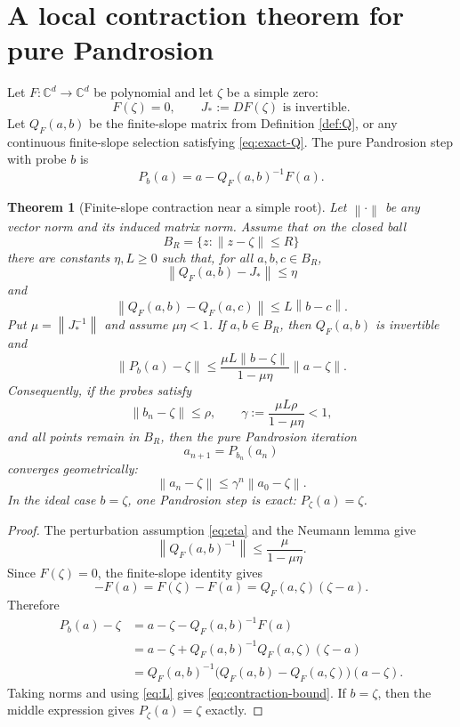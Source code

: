 \documentclass[11pt]{article}
\newtheorem{theorem}{Theorem}[section]
\theoremstyle{definition}
\theoremstyle{remark}
\newcommand{\C}{\mathbb{C}}
\newcommand{\norm}[1]{\left\lVert #1\right\rVert}
\newcommand{\zetaRoot}{\zeta}
\begin{document}
\section{A local contraction theorem for pure Pandrosion}

Let $F:\C^d\to\C^d$ be polynomial and let $\zetaRoot$ be a simple zero:
\[
        F(\zetaRoot)=0,
        \qquad J_*:=DF(\zetaRoot)\text{ is invertible}.
\]
Let $Q_F(a,b)$ be the finite-slope matrix from Definition \ref{def:Q}, or any continuous finite-slope selection satisfying \eqref{eq:exact-Q}.  The pure Pandrosion step with probe $b$ is
\begin{equation}\label{eq:pand-step}
        P_b(a)=a-Q_F(a,b)^{-1}F(a).
\end{equation}

\begin{theorem}[Finite-slope contraction near a simple root]\label{thm:local-contraction}
Let $\norm{\cdot}$ be any vector norm and its induced matrix norm.  Assume that on the closed ball
\[
        B_R=\{z:\norm{z-\zetaRoot}\leq R\}
\]
there are constants $\eta,L\geq 0$ such that, for all $a,b,c\in B_R$,
\begin{equation}\label{eq:eta}
        \norm{Q_F(a,b)-J_*} \leq \eta
\end{equation}
and
\begin{equation}\label{eq:L}
        \norm{Q_F(a,b)-Q_F(a,c)} \leq L\norm{b-c}.
\end{equation}
Put $\mu=\norm{J_*^{-1}}$ and assume $\mu\eta<1$.  If $a,b\in B_R$, then $Q_F(a,b)$ is invertible and
\begin{equation}\label{eq:contraction-bound}
        \norm{P_b(a)-\zetaRoot}
        \leq
        \frac{\mu L\norm{b-\zetaRoot}}{1-\mu\eta}
        \norm{a-\zetaRoot}.
\end{equation}
Consequently, if the probes satisfy
\[
        \norm{b_n-\zetaRoot}\leq \rho,
        \qquad
        \gamma:=\frac{\mu L\rho}{1-\mu\eta}<1,
\]
and all points remain in $B_R$, then the pure Pandrosion iteration
\[
        a_{n+1}=P_{b_n}(a_n)
\]
converges geometrically:
\[
        \norm{a_n-\zetaRoot}\leq \gamma^n\norm{a_0-\zetaRoot}.
\]
In the ideal case $b=\zetaRoot$, one Pandrosion step is exact: $P_{\zetaRoot}(a)=\zetaRoot$.
\end{theorem}

\begin{proof}
The perturbation assumption \eqref{eq:eta} and the Neumann lemma give
\[
        \norm{Q_F(a,b)^{-1}}\leq \frac{\mu}{1-\mu\eta}.
\]
Since $F(\zetaRoot)=0$, the finite-slope identity gives
\[
        -F(a)=F(\zetaRoot)-F(a)=Q_F(a,\zetaRoot)(\zetaRoot-a).
\]
Therefore
\begin{align*}
        P_b(a)-\zetaRoot
        &=a-\zetaRoot-Q_F(a,b)^{-1}F(a)\\
        &=a-\zetaRoot+Q_F(a,b)^{-1}Q_F(a,\zetaRoot)(\zetaRoot-a)\\
        &=Q_F(a,b)^{-1}\bigl(Q_F(a,b)-Q_F(a,\zetaRoot)\bigr)(a-\zetaRoot).
\end{align*}
Taking norms and using \eqref{eq:L} gives \eqref{eq:contraction-bound}.  If $b=\zetaRoot$, then the middle expression gives $P_{\zetaRoot}(a)=\zetaRoot$ exactly.
\end{proof}
\end{document}
